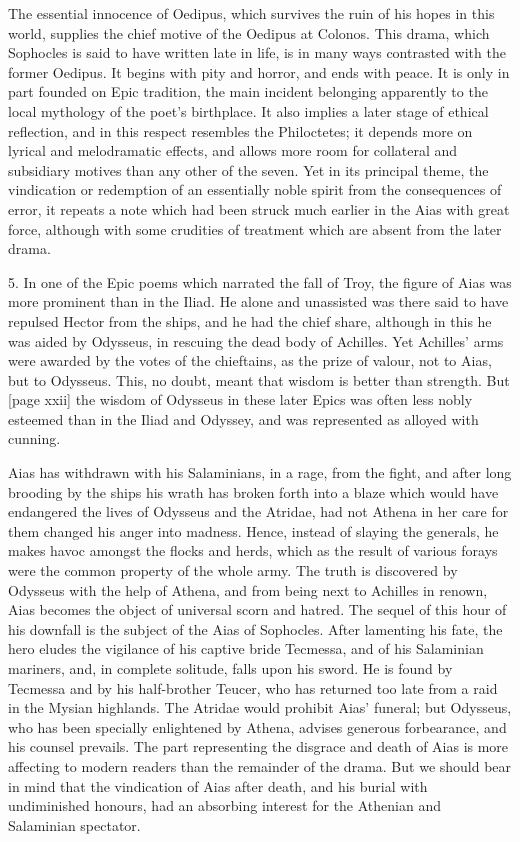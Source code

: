 \documentclass[11pt,letter]{book}
\begin{document}
\par  The essential innocence of Oedipus, which survives the ruin of his hopes in this world, supplies the chief motive of the Oedipus at Colonos. This drama, which Sophocles is said to have written late in life, is in many ways contrasted with the former Oedipus. It begins with pity and horror, and ends with peace. It is only in part founded on Epic tradition, the main incident belonging apparently to the local mythology of the poet’s birthplace. It also implies a later stage of ethical reflection, and in this respect resembles the Philoctetes; it depends more on lyrical and melodramatic effects, and allows more room for collateral and subsidiary motives than any other of the seven. Yet in its principal theme, the vindication or redemption of an essentially noble spirit from the consequences of error, it repeats a note which had been struck much earlier in the Aias with great force, although with some crudities of treatment which are absent from the later drama.

\par  5. In one of the Epic poems which narrated the fall of Troy, the figure of Aias was more prominent than in the Iliad. He alone and unassisted was there said to have repulsed Hector from the ships, and he had the chief share, although in this he was aided by Odysseus, in rescuing the dead body of Achilles. Yet Achilles’ arms were awarded by the votes of the chieftains, as the prize of valour, not to Aias, but to Odysseus. This, no doubt, meant that wisdom is better than strength. But [page xxii] the wisdom of Odysseus in these later Epics was often less nobly esteemed than in the Iliad and Odyssey, and was represented as alloyed with cunning.

\par  Aias has withdrawn with his Salaminians, in a rage, from the fight, and after long brooding by the ships his wrath has broken forth into a blaze which would have endangered the lives of Odysseus and the Atridae, had not Athena in her care for them changed his anger into madness. Hence, instead of slaying the generals, he makes havoc amongst the flocks and herds, which as the result of various forays were the common property of the whole army. The truth is discovered by Odysseus with the help of Athena, and from being next to Achilles in renown, Aias becomes the object of universal scorn and hatred. The sequel of this hour of his downfall is the subject of the Aias of Sophocles. After lamenting his fate, the hero eludes the vigilance of his captive bride Tecmessa, and of his Salaminian mariners, and, in complete solitude, falls upon his sword. He is found by Tecmessa and by his half-brother Teucer, who has returned too late from a raid in the Mysian highlands. The Atridae would prohibit Aias’ funeral; but Odysseus, who has been specially enlightened by Athena, advises generous forbearance, and his counsel prevails. The part representing the disgrace and death of Aias is more affecting to modern readers than the remainder of the drama. But we should bear in mind that the vindication of Aias after death, and his burial with undiminished honours, had an absorbing interest for the Athenian and Salaminian spectator.
\end{document}
